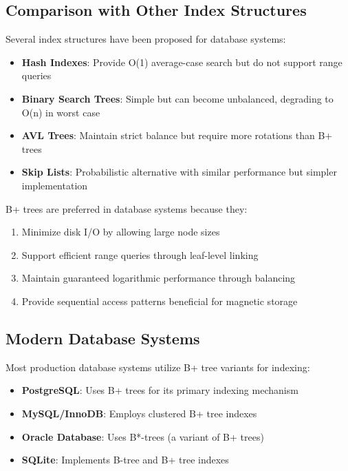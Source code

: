 \documentclass[conference]{IEEEtran}
\begin{document}
\subsection{Comparison with Other Index Structures}

Several index structures have been proposed for database systems:

\begin{itemize}
    \item \textbf{Hash Indexes}: Provide O(1) average-case search but do not support range queries
    \item \textbf{Binary Search Trees}: Simple but can become unbalanced, degrading to O(n) in worst case
    \item \textbf{AVL Trees}: Maintain strict balance but require more rotations than B+ trees
    \item \textbf{Skip Lists}: Probabilistic alternative with similar performance but simpler implementation
\end{itemize}

B+ trees are preferred in database systems because they:
\begin{enumerate}
    \item Minimize disk I/O by allowing large node sizes
    \item Support efficient range queries through leaf-level linking
    \item Maintain guaranteed logarithmic performance through balancing
    \item Provide sequential access patterns beneficial for magnetic storage
\end{enumerate}

\subsection{Modern Database Systems}

Most production database systems utilize B+ tree variants for indexing:

\begin{itemize}
    \item \textbf{PostgreSQL}: Uses B+ trees for its primary indexing mechanism
    \item \textbf{MySQL/InnoDB}: Employs clustered B+ tree indexes
    \item \textbf{Oracle Database}: Uses B*-trees (a variant of B+ trees)
    \item \textbf{SQLite}: Implements B-tree and B+ tree indexes
\end{itemize}
\end{document}

